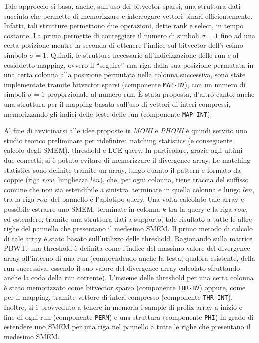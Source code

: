 \documentclass[a4paper,11pt, oneside,italian]{article}
\begin{document}
Tale approccio si basa, anche, sull'uso dei bitvector 
sparsi, una struttura dati succinta che permette di memorizzare e interrogare
vettori binari efficientemente. Infatti, tali strutture permettono due
operazioni, dette rank e select, in tempo costante. La prima permette di
conteggiare il 
numero di simboli $\sigma=1$ fino ad una certa posizione mentre la seconda di
ottenere l'indice sul bitvector dell'$i$-esimo simbolo $\sigma=1$.
Quindi, le strutture necessarie all'indicizzazione delle run e al cosiddetto
mapping, ovvero il ``seguire'' una riga dalla sua posizione permutata in una
certa colonna alla posizione permutata nella colonna successiva,
sono state implementate tramite bitvector sparsi (componente \texttt{MAP-BV}),
con un numero di simboli 
$\sigma=1$ proporzionale al numero run. È stata  proposta, d'altro canto, anche
una struttura per il mapping basata sull'uso di vettori di interi compressi,
memorizzando gli indici delle teste delle run (componente \texttt{MAP-INT}).

Al fine di avvicinarsi alle idee proposte in \textit{MONI} e \textit{PHONI} è
quindi servito uno studio teorico preliminare per ridefinire: matching
statistics (e conseguente calcolo degli SMEM), threshold e LCE query. In
particolare, grazie agli  
ultimi due concetti, si è potuto evitare di memorizzare il divergence array.
Le matching statistics sono definite tramite un array,
lungo quanto il pattern e formato da coppie (riga $row$, lunghezza $len$), che,
per ogni colonna, tiene traccia del suffisso comune che non sia estendibile a
sinistra, terminate in quella colonna e lungo $len$, tra la riga $row$ del
pannello e l'aplotipo query. Una volta calcolato tale
array è possibile estrarre uno SMEM, terminate in colonna $k$ tra la query e la
riga $row$, ed estendere, tramite una struttura dati a supporto, tale risultato
a tutte le altre righe del pannello che presentano il medesimo SMEM.
Il primo metodo di calcolo di tale array è stato basato sull'utilizzo delle
threshold. Ragionando sulla matrice PBWT, una threshold è definita
come l'indice del massimo valore del divergence array all'interno di una run
(comprendendo anche la testa, qualora esistente, della run successiva, essendo
il suo valore del divergence array calcolato sfruttando anche la coda della run
corrente). L'insieme delle threshold per una certa colonna è stato memorizzato
come bitvector sparso (componente \texttt{THR-BV}) oppure, come per il mapping,
tramite vettore di interi compresso (componente \texttt{THR-INT}). Inoltre, si è
provveduto a tenere in memoria i  
sample di prefix array a inizio e fine di ogni run (componente \texttt{PERM}) e
una struttura (componente \texttt{PHI}) in grado di estendere uno SMEM per una
riga nel pannello a tutte le righe che presentano il medesimo SMEM.
\end{document}
